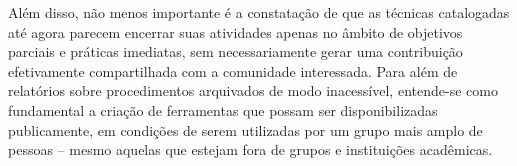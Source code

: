 \documentclass{sciposter}
\begin{document}
\begin{multicols}{2}
Além disso, não menos importante é a constatação de que as técnicas catalogadas
até agora parecem encerrar suas atividades apenas no âmbito de objetivos
parciais e práticas imediatas, sem necessariamente gerar uma contribuição
efetivamente compartilhada com a comunidade interessada. Para além de
relatórios sobre procedimentos arquivados de modo inacessível, entende-se como
fundamental a criação de ferramentas que possam ser disponibilizadas
publicamente, em condições de serem utilizadas por um grupo mais amplo de
pessoas -- mesmo aquelas que estejam fora de grupos e instituições acadêmicas.

\renewcommand{\refname}{Bibliografia}

\nocite{Lengler2007}



\end{multicols}
\end{document}
